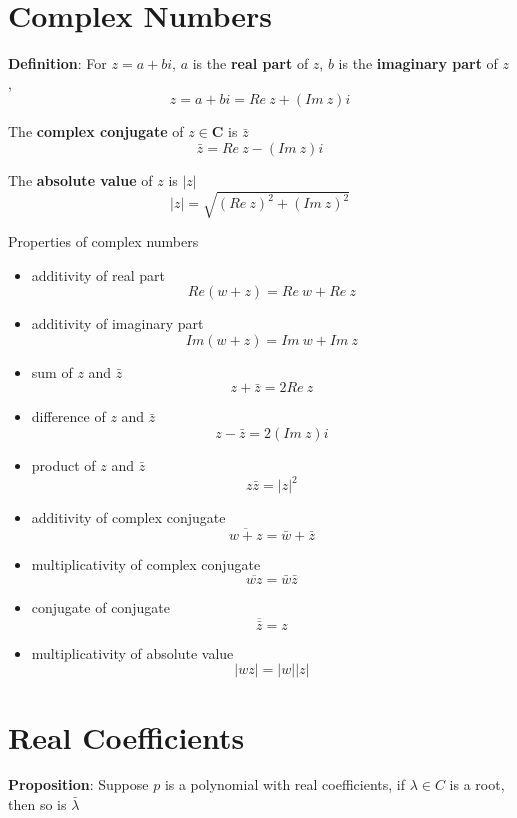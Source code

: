 \documentclass[a4paper, 10pt]{report}
\begin{document}
\section{Complex Numbers}

\begin{framed}
   \textbf{Definition}: For $z = a + bi$,  $a$ is the \textbf{real part} of $z$, $b$ is the \textbf{imaginary part} of $z$, 
   \[
     z = a + bi = Re\ z + (Im\ z)i
   \] 

   The \textbf{complex conjugate} of $z \in \textbf{C}$ is $\bar{z}$ 
   \[
      \bar{z} = Re\ z - (Im\ z) i
   \] 

   The \textbf{absolute value} of $z$ is $ \left| z \right| $ 
   \[
     \left| z  \right|  = \sqrt{(Re\ z)^2 + (Im\ z)^2}
   \] 
\end{framed}

Properties of complex numbers
\begin{itemize}
   \item additivity of real part
      \[
        Re(w + z) = Re\ w + Re\ z
      \] 
   \item additivity of imaginary part
      \[
        Im(w + z) = Im\ w + Im\ z
      \] 
   \item sum of $z$ and $\bar{z}$
      \[
         z + \bar{z} = 2Re\ z
      \] 
   \item difference of $z$ and $\bar{z}$
      \[
         z - \bar{z} = 2(Im\ z)i
      \] 
   \item product of $z$ and $\bar{z}$
      \[
         z  \bar{z} = |z|^2
      \] 
   \item additivity of complex conjugate
      \[
         \overline{w + z} = \bar{w} + \bar{z}
      \] 
   \item multiplicativity of complex conjugate
      \[
         \overline{w z} = \bar{w}\bar{z}
      \] 
   \item conjugate of conjugate
      \[
         \overline{\bar{z}} = z
      \] 
   \item multiplicativity of absolute value
      \[
         \left| wz \right|  = \left| w \right| \left| z \right| 
      \] 
\end{itemize}

\section{Real Coefficients}
\begin{framed}
   \textbf{Proposition}: Suppose $p$ is a polynomial with real coefficients, if $\lambda \in C$ is a root, then so is $\bar{\lambda}$
\end{framed}
\end{document}
